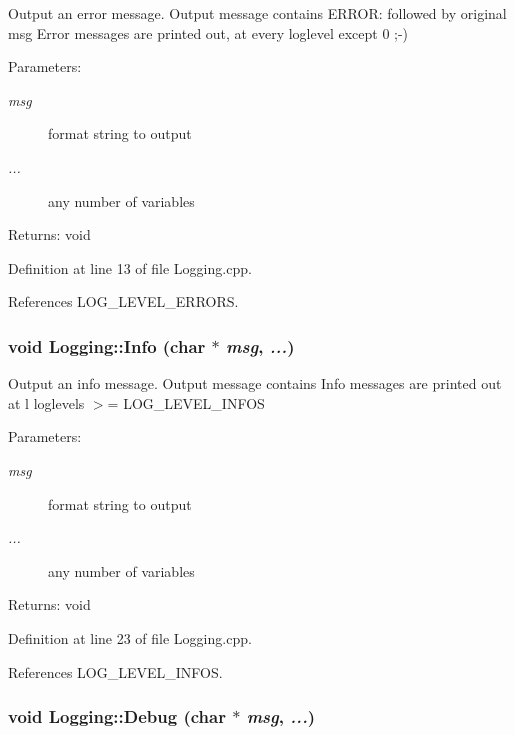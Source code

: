 Output an error message. Output message contains ERROR: followed by original msg Error messages are printed out, at every loglevel except 0 ;-) \begin{Desc}
\item[Parameters:]
\begin{description}
\item[{\em msg}]format string to output \item[{\em ...}]any number of variables \end{description}
\end{Desc}
\begin{Desc}
\item[Returns:]void \end{Desc}


Definition at line 13 of file Logging.cpp.

References LOG\_\-LEVEL\_\-ERRORS.\hypertarget{class_logging_8a99e1a55e2b24d864d89e9aa86b2f2e}{
\subsubsection[Info]{\setlength{\rightskip}{0pt plus 5cm}void Logging::Info (char $\ast$ {\em msg}, \/   {\em ...})}}
\label{class_logging_8a99e1a55e2b24d864d89e9aa86b2f2e}


Output an info message. Output message contains Info messages are printed out at l loglevels $>$= LOG\_\-LEVEL\_\-INFOS

\begin{Desc}
\item[Parameters:]
\begin{description}
\item[{\em msg}]format string to output \item[{\em ...}]any number of variables \end{description}
\end{Desc}
\begin{Desc}
\item[Returns:]void \end{Desc}


Definition at line 23 of file Logging.cpp.

References LOG\_\-LEVEL\_\-INFOS.\hypertarget{class_logging_e0fcd9e5350d7b9158c8ae9289fef193}{
\subsubsection[Debug]{\setlength{\rightskip}{0pt plus 5cm}void Logging::Debug (char $\ast$ {\em msg}, \/   {\em ...})}}
\label{class_logging_e0fcd9e5350d7b9158c8ae9289fef193}



